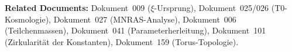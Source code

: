 \vspace{1.5em}

\noindent\textbf{Related Documents:}
Dokument~009 ($\xi$-Ursprung),
Dokument~025/026 (T0-Kosmologie),
Dokument~027 (MNRAS-Analyse),
Dokument~006 (Teilchenmassen),
Dokument~041 (Parameterherleitung),
Dokument~101 (Zirkularität der Konstanten),
Dokument~159 (Torus-Topologie).
